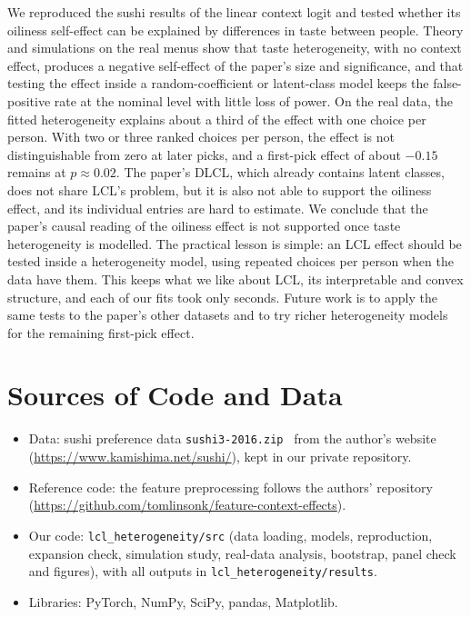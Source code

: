 \documentclass[11pt,journal,a4paper]{IEEEtran}
\begin{document}
We reproduced the sushi results of the linear context logit and tested whether its oiliness self-effect can
be explained by differences in taste between people. Theory and simulations on the real menus show that taste
heterogeneity, with no context effect, produces a negative self-effect of the paper's size and significance,
and that testing the effect inside a random-coefficient or latent-class model keeps the false-positive rate
at the nominal level with little loss of power. On the real data, the fitted heterogeneity explains about a
third of the effect with one choice per person. With two or three ranked choices per person, the effect is
not distinguishable from zero at later picks, and a first-pick effect of about $-0.15$ remains at
$p\approx0.02$. The paper's DLCL, which already contains latent classes, does not share LCL's problem, but it is
also not able to support the oiliness effect, and its individual entries are hard to estimate. We conclude that
the paper's causal reading of the oiliness effect is not supported once taste heterogeneity is modelled. The practical lesson is simple: an LCL effect should be tested inside a
heterogeneity model, using repeated choices per person when the data have them. This keeps what we like about
LCL, its interpretable and convex structure, and each of our fits took only seconds. Future work is to apply the same tests to the paper's other
datasets and to try richer heterogeneity models for the remaining first-pick effect.

\appendices
\section{Sources of Code and Data}
\begin{itemize}
\item Data: sushi preference data \texttt{sushi3-2016.zip}~\cite{kamishima03} from the author's website
      (\url{https://www.kamishima.net/sushi/}), kept in our private repository.
\item Reference code: the feature preprocessing follows the authors' repository
      (\url{https://github.com/tomlinsonk/feature-context-effects}).
\item Our code: \texttt{lcl\_heterogeneity/src} (data loading, models, reproduction, expansion check,
      simulation study, real-data analysis, bootstrap, panel check and figures), with all outputs in
      \texttt{lcl\_heterogeneity/results}.
\item Libraries: PyTorch, NumPy, SciPy, pandas, Matplotlib.
\end{itemize}
\end{document}
